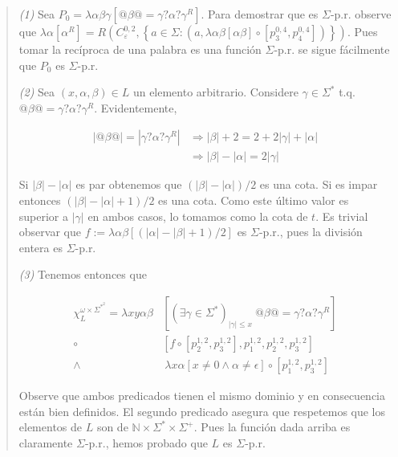 \documentclass[a4paper, 12pt]{article}
\begin{document}
\small
\begin{quote}

\textit{(1)} Sea $P_0 = \lambda \alpha\beta\gamma\left[ @\beta@ =
\gamma?\alpha?\gamma^R  \right]$. Para demostrar que es $\Sigma$-p.r. observe
que $\lambda \alpha \left[  \alpha^R  \right] = R\left(C_{\varepsilon }^{0, 2},
\left\{ a \in \Sigma : \left( a, \lambda \alpha\beta \left[  \alpha\beta
\right] \circ \left[ p_3^{0, 4}, p_4^{0, 4} \right]  \right)  \right\}\right) $. Pues
tomar la recíproca de una palabra es una función $\Sigma$-p.r. se sigue
fácilmente que $P_0$ es $\Sigma$-p.r. 

\textit{(2)} Sea $\left( x, \alpha, \beta \right) \in  L $ un elemento
arbitrario. Considere $\gamma \in \Sigma^{*}$ t.q. $@\beta@ =
\gamma?\alpha?\gamma^{R}$. Evidentemente, 

\begin{align*}
    |@\beta @| =| \gamma?\alpha?\gamma^{R}| &\Rightarrow |\beta| + 2 = 2 + 2|\gamma|
    + |\alpha| \\ 
                                          &\Rightarrow |\beta| - |\alpha| =
                                          2|\gamma|
\end{align*}

Si $|\beta| - |\alpha|$ es par obtenemos que $(|\beta| - |\alpha|)/2$ es una
cota. Si es impar entonces $(|\beta| - |\alpha| + 1) / 2$ es una cota. Como este
último valor es superior a $|\gamma|$ en ambos casos, lo tomamos como la cota de
$t$. Es trivial observar que $f := \lambda \alpha\beta \left[ (|\alpha| - |\beta| +
1) / 2  \right]$ es $\Sigma$-p.r., pues la división entera es $\Sigma$-p.r. 

\textit{(3)} Tenemos entonces que 

\begin{align*}
    \chi_L^{\omega\times \Sigma^{*}^2} = \lambda xy\alpha\beta &\left[ \left(
    \exists \gamma\in \Sigma^{*} \right)_{|\gamma| \leq x} ~ @\beta@ =
\gamma?\alpha?\gamma^{R}   \right] \\ 
            \circ & \left[ f \circ \left[ p_2^{1, 2}, p_3^{1, 2} \right],
            p_1^{1, 2}, p_2^{1, 2}, p_3^{1, 2}  \right] \\ 
                \land &~ \lambda x\alpha \left[ x \neq 0 \land \alpha \neq
                \epsilon  \right] \circ \left[ p_1^{1, 2}, p_3^{1, 2} \right] 
\end{align*}

Observe que ambos predicados tienen el mismo dominio y en consecuencia están
bien definidos. El segundo predicado asegura que respetemos que los elementos de
$L$ son de $\mathbb{N} \times {\Sigma^{*}} \times \Sigma^{+}$. Pues la función
dada arriba es claramente $\Sigma$-p.r., hemos probado que $L$ es $\Sigma$-p.r. 

\end{quote}
\normalsize
\end{document}
